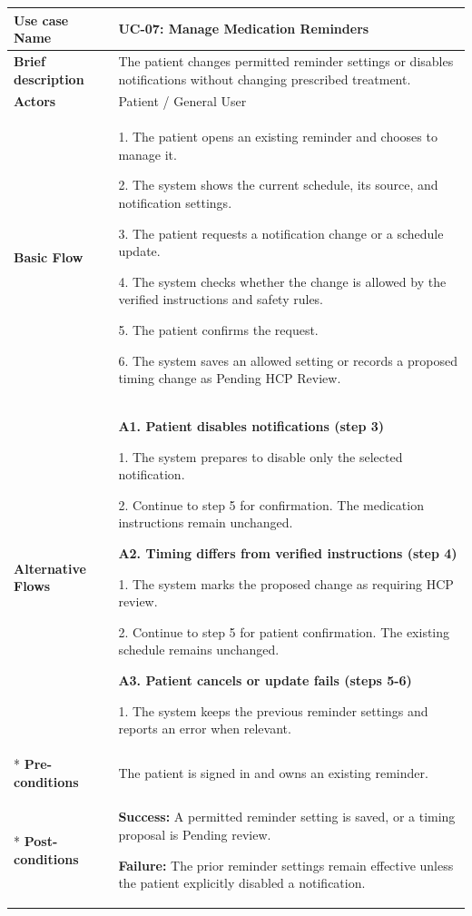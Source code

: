 \begin{longtable}{|p{}|p{}|}
\hline
\textbf{Use case Name} & UC-07: Manage Medication Reminders \\ \hline
\textbf{Brief description} & The patient changes permitted reminder settings or disables notifications without changing prescribed treatment. \\ \hline
\textbf{Actors} & Patient / General User \\ \hline
\textbf{Basic Flow} &
1. The patient opens an existing reminder and chooses to manage it.\par
2. The system shows the current schedule, its source, and notification settings.\par
3. The patient requests a notification change or a schedule update.\par
4. The system checks whether the change is allowed by the verified instructions and safety rules.\par
5. The patient confirms the request.\par
6. The system saves an allowed setting or records a proposed timing change as Pending HCP Review.
\\ \hline
\textbf{Alternative Flows} &
\textbf{A1. Patient disables notifications (step 3)}\par
1. The system prepares to disable
only the selected notification.\par
2. Continue to step 5 for confirmation.
The medication instructions remain unchanged.
\par

\textbf{A2. Timing differs from verified
instructions (step 4)}\par
1. The system marks the proposed
change as requiring HCP review.\par
2. Continue to step 5 for patient
confirmation. The existing schedule
remains unchanged.

\par
\textbf{A3. Patient cancels or update fails (steps 5-6)}\par
1. The system keeps the previous reminder settings and reports an error when relevant.
\\* \hline
\textbf{Pre-conditions} & The patient is signed in and owns an existing reminder. \\* \hline
\textbf{Post-conditions} & \textbf{Success:} A permitted reminder setting is saved, or a timing proposal is Pending review.\par
\textbf{Failure:} The prior reminder settings remain effective unless the patient explicitly disabled a notification. \\ \hline
\end{longtable}

